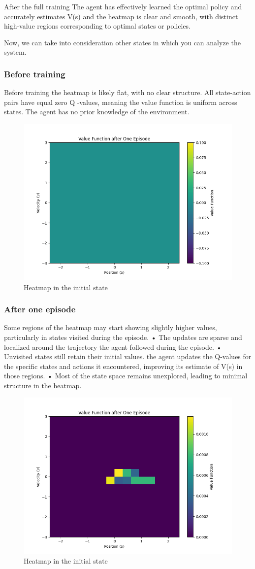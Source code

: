 \documentclass{article}
\begin{document}
After the full training The agent has effectively learned the optimal policy and accurately estimates V(s) and the heatmap is clear and smooth, with distinct high-value regions corresponding to optimal states or policies.

Now, we can take into consideration other states in which you can analyze the system.

\pagebreak

\subsubsection{Before training}
Before training the heatmap is likely flat, with no clear structure. All state-action pairs have equal zero Q -values, meaning  the value function is uniform across states. The agent has no prior knowledge of the environment.

\begin{figure}[h]
	\centering
	\includegraphics[width=0.5\linewidth]{../data/plot/heatmap_initial_training_constant_0.2.png}
	\caption{Heatmap in the initial state}
	\label{fig:plot1}
\end{figure}

\subsubsection{After one episode}
Some regions of the heatmap may start showing slightly higher values, particularly in states visited during the episode.
•	The updates are sparse and localized around the trajectory the agent followed during the episode.
•	Unvisited states still retain their initial values. the agent updates the Q-values for the specific states and actions it encountered, improving its estimate of  V(s)  in those regions.
•	Most of the state space remains unexplored, leading to minimal structure in the heatmap.
\begin{figure}[h]
	\centering
	\includegraphics[width=0.5\linewidth]{../data/plot/heatmap_after_one_episode_constant_0.2.png}
	\caption{Heatmap in the initial state}
	\label{fig:plot1}
\end{figure}
\end{document}
